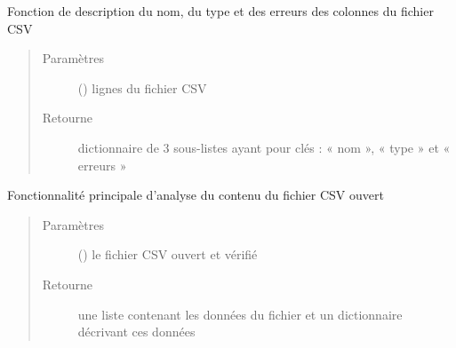 \documentclass[letterpaper,10pt,french]{sphinxmanual}
\begin{document}

\begin{fulllineitems}
\label{\detokenize{analyseContenuFichier:chargement_des_donnees.analyseContenuFichier.removeDateSuffix}}
\end{fulllineitems}


\begin{fulllineitems}
\label{\detokenize{analyseContenuFichier:chargement_des_donnees.analyseContenuFichier.descriptionColonnes}}
Fonction de description du nom, du type et des erreurs des colonnes du fichier CSV
\begin{quote}\begin{description}
\item[{Paramètres}] \leavevmode
{} () \textendash{} lignes du fichier CSV

\item[{Retourne}] \leavevmode
dictionnaire de 3 sous-listes ayant pour clés : « nom », « type » et « erreurs »

\end{description}\end{quote}

\end{fulllineitems}


\begin{fulllineitems}
\label{\detokenize{analyseContenuFichier:chargement_des_donnees.analyseContenuFichier.analyseFichier}}
Fonctionnalité principale d’analyse du contenu du fichier CSV ouvert
\begin{quote}\begin{description}
\item[{Paramètres}] \leavevmode
{} () \textendash{} le fichier CSV ouvert et vérifié

\item[{Retourne}] \leavevmode
une liste contenant les données du fichier et un dictionnaire décrivant ces données

\end{description}\end{quote}

\end{fulllineitems}
\end{document}
